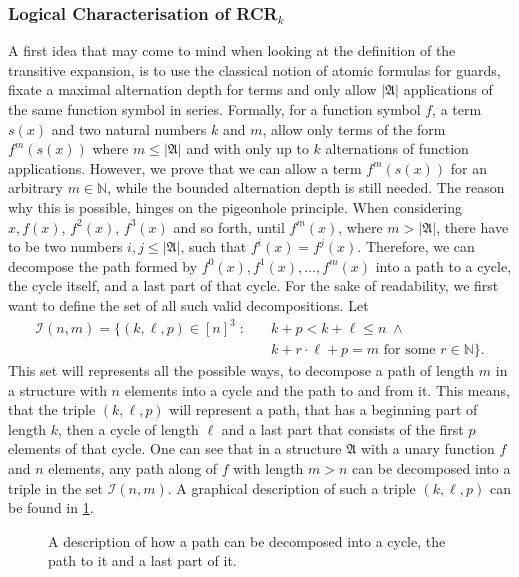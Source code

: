 \subsubsection{Logical Characterisation of RCR$_k$}

A first idea that may come to mind when looking at the definition of the transitive expansion, is to use the classical notion of atomic formulas for guards, fixate a maximal alternation depth for terms and only allow $\vert \mathfrak{A}\vert$ applications of the same function symbol in series.
Formally, for a function symbol $f$, a term $s(x)$ and two natural numbers $k$ and $m$, allow only terms of the form $f^m(s(x))$ where $m\leq\vert\mathfrak A\vert$ and with only up to $k$ alternations of function applications.
However, we prove that we can allow a term $f^m(s(x))$ for an arbitrary $m\in\mathbb N$, while the bounded alternation depth is still needed.
The reason why this is possible, hinges on the pigeonhole principle.
When considering $x,f(x)$, $f^2(x)$, $f^3(x)$ and so forth, until $f^m(x)$, where $m>\vert\mathfrak A\vert$, there have to be two numbers $i,j\leq \vert\mathfrak A\vert$, such that $f^i(x)=f^j(x)$.
Therefore, we can decompose the path formed by $f^0(x),f^1(x),\dots,f^m(x)$ into a path to a cycle, the cycle itself, and a last part of that cycle.
For the sake of readability, we first want to define the set of all such valid decompositions.
Let 
\begin{align*}
	\mathcal I(n,m)=\{(k,\ell,p)\in [n]^3 \;:\quad & k+p < k+\ell \leq n \; \land \\
	& k+r\cdot \ell + p = m \text{ for some } r\in \mathbb N\}.
\end{align*}
This set will represents all the possible ways, to decompose a path of length $m$ in a structure with $n$ elements into a cycle and the path to and from it.
This means, that the triple $(k,\ell,p)$ will represent a path, that has a beginning part of length $k$, then a cycle of length $\ell$ and a last part that consists of the first $p$ elements of that cycle.
One can see that in a structure $\mathfrak A$ with a unary function $f$ and $n$ elements, any path along of $f$ with length $m>n$ can be decomposed into a triple in the set $\mathcal I(n,m)$.
A graphical description of such a triple $(k,\ell,p)$ can be found in \cref{PathDecompositionPrinciple}.

\begin{figure}
	\centering
	
	\caption{A description of how a path can be decomposed into a cycle, the path to it and a last part of it.}
	\label{PathDecompositionPrinciple}
\end{figure}

